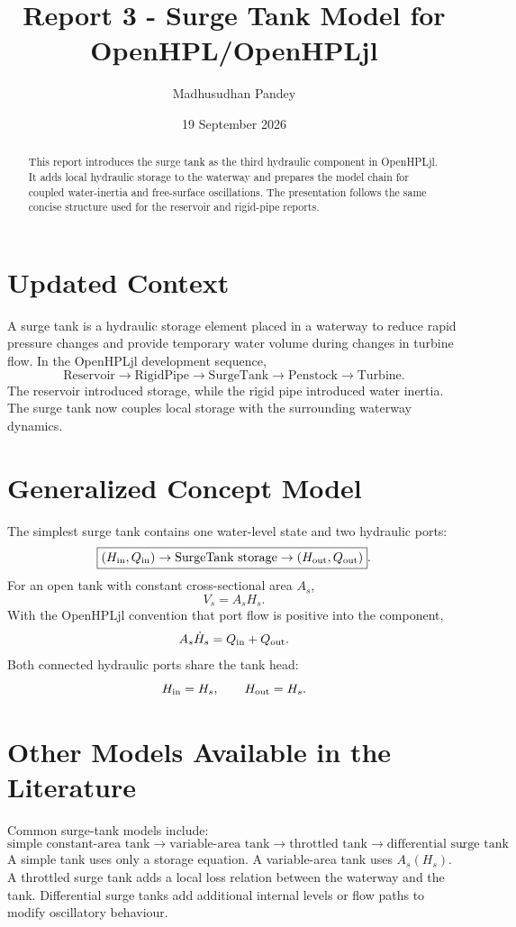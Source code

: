 \documentclass[11pt,a4paper]{article}
\title{Report 3 - Surge Tank Model for OpenHPL/OpenHPLjl}
\author{Madhusudhan Pandey}
\date{19 September 2026}
\begin{document}
\maketitle
\begin{abstract}
This report introduces the surge tank as the third hydraulic component in OpenHPLjl. It adds local hydraulic storage to the waterway and prepares the model chain for coupled water-inertia and free-surface oscillations. The presentation follows the same concise structure used for the reservoir and rigid-pipe reports.
\end{abstract}

\section{Updated Context}
A surge tank is a hydraulic storage element placed in a waterway to reduce rapid pressure changes and provide temporary water volume during changes in turbine flow. In the OpenHPLjl development sequence,
\[
\boxed{\text{Reservoir}\rightarrow\text{RigidPipe}\rightarrow\text{SurgeTank}\rightarrow\text{Penstock}\rightarrow\text{Turbine}}.
\]
The reservoir introduced storage, while the rigid pipe introduced water inertia. The surge tank now couples local storage with the surrounding waterway dynamics.

\section{Generalized Concept Model}
The simplest surge tank contains one water-level state and two hydraulic ports:
\[
\boxed{(H_{\rm in},Q_{\rm in})\rightarrow\text{SurgeTank storage}\rightarrow(H_{\rm out},Q_{\rm out})}.
\]
For an open tank with constant cross-sectional area $A_s$,
\[
V_s=A_sH_s.
\]
With the OpenHPLjl convention that port flow is positive into the component,
\[
A_s\dot H_s=Q_{\rm in}+Q_{\rm out}.
\]
Both connected hydraulic ports share the tank head:
\[
H_{\rm in}=H_s,\qquad H_{\rm out}=H_s.
\]

\section{Other Models Available in the Literature}
Common surge-tank models include:
\[
\boxed{\text{simple constant-area tank}\rightarrow\text{variable-area tank}\rightarrow\text{throttled tank}\rightarrow\text{differential surge tank}}.
\]
A simple tank uses only a storage equation. A variable-area tank uses $A_s(H_s)$. A throttled surge tank adds a local loss relation between the waterway and the tank. Differential surge tanks add additional internal levels or flow paths to modify oscillatory behaviour.
\end{document}
